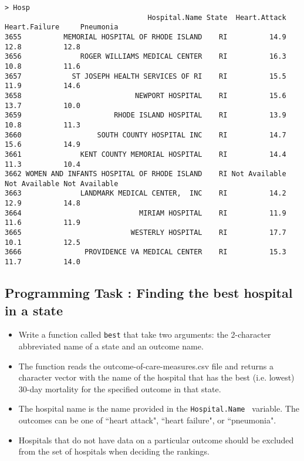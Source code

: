 \documentclass[]{article}
\begin{document}
{
\small
\begin{verbatim}
> Hosp
                                  Hospital.Name State  Heart.Attack Heart.Failure     Pneumonia
3655          MEMORIAL HOSPITAL OF RHODE ISLAND    RI          14.9          12.8          12.8
3656              ROGER WILLIAMS MEDICAL CENTER    RI          16.3          10.8          11.6
3657            ST JOSEPH HEALTH SERVICES OF RI    RI          15.5          11.9          14.6
3658                           NEWPORT HOSPITAL    RI          15.6          13.7          10.0
3659                      RHODE ISLAND HOSPITAL    RI          13.9          10.8          11.3
3660                  SOUTH COUNTY HOSPITAL INC    RI          14.7          15.6          14.9
3661              KENT COUNTY MEMORIAL HOSPITAL    RI          14.4          11.3          10.4
3662 WOMEN AND INFANTS HOSPITAL OF RHODE ISLAND    RI Not Available Not Available Not Available
3663              LANDMARK MEDICAL CENTER,  INC    RI          14.2          12.9          14.8
3664                            MIRIAM HOSPITAL    RI          11.9          11.6          11.9
3665                          WESTERLY HOSPITAL    RI          17.7          10.1          12.5
3666               PROVIDENCE VA MEDICAL CENTER    RI          15.3          11.7          14.0

\end{verbatim}
}


\newpage
\subsection{Programming Task :  Finding the best hospital in a state}

\begin{itemize}
\item Write a function called \texttt{best} that take two arguments: the 2-character abbreviated name of a state and an
outcome name. \item The function reads the outcome-of-care-measures.csv file and returns a character vector
with the name of the hospital that has the best (i.e. lowest) 30-day mortality for the specified outcome
in that state. \item The hospital name is the name provided in the \texttt{Hospital.Name } variable. The outcomes can
be one of ``heart attack", ``heart failure", or ``pneumonia". \item Hospitals that do not have data on a particular
outcome should be excluded from the set of hospitals when deciding the rankings.
\end{itemize}
\end{document}
